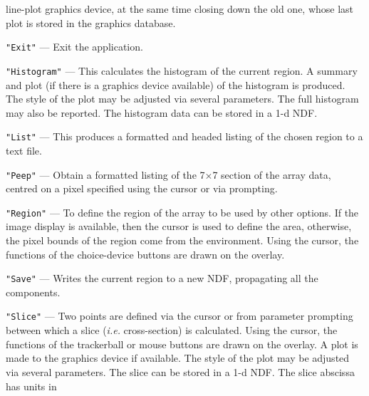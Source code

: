 \documentclass[twoside,11pt]{article}
\begin{document}
{{{\begin{description}
                          line-plot graphics device, at the same time
                          closing down the old one, whose last plot is
                          stored in the graphics database.
         \item {\tt "Exit"} --- Exit the application.
         \item {\tt "Histogram"} --- This calculates the histogram of the current
                          region. A summary and plot (if there is a
                          graphics device available) of the histogram
                          is produced.  The style of the plot may be
                          adjusted via several parameters.  The full
                          histogram may also be reported. The histogram
                          data can be stored in a 1-d NDF.
         \item {\tt "List"} --- This produces a formatted and headed listing
                          of the chosen region to a text file.
         \item {\tt "Peep"} --- Obtain a formatted listing of the 7$\times$7 section
                          of the array data, centred on a pixel
                          specified using the cursor or via prompting.
         \item {\tt "Region"} --- To define the region of the array to be used
                          by other options. If the image display
                          is available, then the cursor is used to
                          define the area, otherwise, the pixel bounds
                          of the region come from the environment. Using
                          the cursor, the functions of the choice-device
                          buttons are drawn on the overlay.
         \item {\tt "Save"} --- Writes the current region to a new NDF,
                          propagating all the components.
         \item {\tt "Slice"} --- Two points are defined via the cursor or from
                          parameter prompting between which a slice ({\it i.e.}
                          cross-section) is calculated.  Using the
                          cursor, the functions of the trackerball or
                          mouse buttons are drawn on the overlay. A plot
                          is made to the graphics device if available.
                          The style of the plot may be adjusted via
                          several parameters.  The slice can be stored
                          in a 1-d NDF.  The slice abscissa has units in

\end{description}}}}
\end{document}
